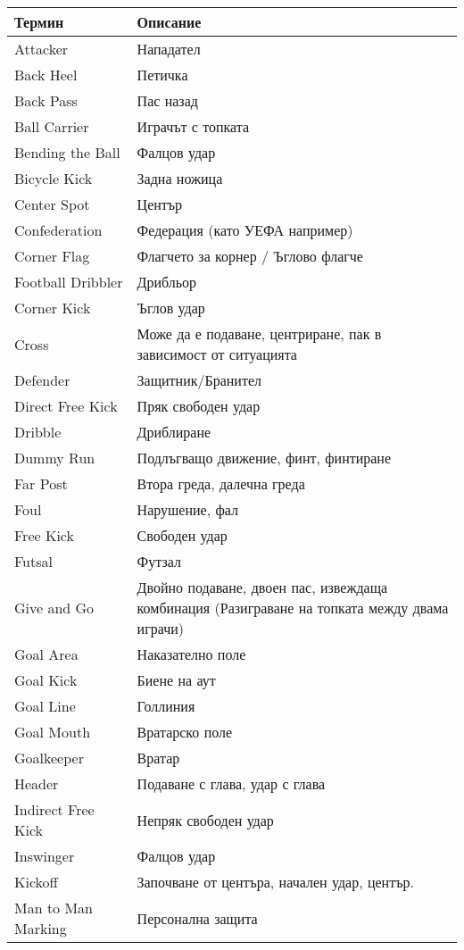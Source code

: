 \begin{longtable}{|p{}|p{}|}
    \hline
    \textbf{Термин} & \textbf{Описание} \\
    \hline
    \endhead
    \hline
    \endfoot
    \hline
    \endlastfoot
    \hline
    Attacker&Нападател\\ 
Back Heel&Петичка\\ 
Back Pass&Пас назад\\ 
Ball Carrier&Играчът с топката\\ 
Bending the Ball&Фалцов удар\\ 
Bicycle Kick&Задна ножица\\ 
Center Spot&Център\\ 
Confederation&Федерация (като УЕФА например)\\ 
Corner Flag&Флагчето за корнер / Ъглово флагче\\ 
Football Dribbler&Дрибльор\\ 
Corner Kick&Ъглов удар\\ 
Cross&Може да е подаване, центриране, пак в зависимост от ситуацията\\ 
Defender&Защитник/Бранител\\ 
Direct Free Kick&Пряк свободен удар\\ 
Dribble&Дриблиране\\ 
Dummy Run&Подлъгващо движение, финт, финтиране\\ 
Far Post&Втора греда, далечна греда\\ 
Foul&Нарушение, фал\\ 
Free Kick&Свободен удар\\ 
Futsal&Футзал\\ 
Give and Go&Двойно подаване, двоен пас, извеждаща комбинация (Разиграване на топката между двама играчи)\\ 
Goal Area&Наказателно поле\\ 
Goal Kick&Биене на аут\\ 
Goal Line&Голлиния\\ 
Goal Mouth&Вратарско поле\\ 
Goalkeeper&Вратар\\ 
Header&Подаване с глава, удар с глава\\ 
Indirect Free Kick&Непряк свободен удар\\ 
Inswinger&Фалцов удар\\ 
Kickoff&Започване от центъра, начален удар, център.\\ 
Man to Man Marking&Персонална защита\\ 

\end{longtable}
